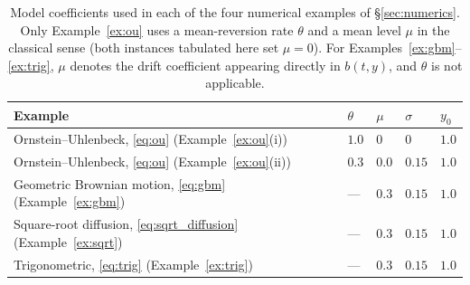 \documentclass[11pt, a4paper]{article}
\theoremstyle{theoremstyle}
\theoremstyle{definitionstyle}
\begin{document}
\begin{table}[htbp]
    \centering
    \caption{Model coefficients used in each of the four numerical examples of \S\ref{sec:numerics}. Only Example~\ref{ex:ou} uses a mean-reversion rate $\theta$ and a mean level $\mu$ in the classical sense (both instances tabulated here set $\mu=0$). For Examples~\ref{ex:gbm}--\ref{ex:trig}, $\mu$ denotes the drift coefficient appearing directly in $b(t,y)$, and $\theta$ is not applicable.}
    \label{tab:model_parameters}
    \begin{tabular}{lllll}
        \toprule
        Example & $\theta$ & $\mu$ & $\sigma$ & $y_0$ \\
        \midrule
        Ornstein--Uhlenbeck, \eqref{eq:ou} (Example~\ref{ex:ou}(i)) & $1.0$ & $0$ & $0$ & $1.0$ \\
        Ornstein--Uhlenbeck, \eqref{eq:ou} (Example~\ref{ex:ou}(ii)) & $0.3$ & $0.0$ & $0.15$ & $1.0$ \\
        Geometric Brownian motion, \eqref{eq:gbm} (Example~\ref{ex:gbm}) & --- & $0.3$ & $0.15$ & $1.0$ \\
        Square-root diffusion, \eqref{eq:sqrt_diffusion} (Example~\ref{ex:sqrt}) & --- & $0.3$ & $0.15$ & $1.0$ \\
        Trigonometric, \eqref{eq:trig} (Example~\ref{ex:trig}) & --- & $0.3$ & $0.15$ & $1.0$ \\
        \bottomrule
    \end{tabular}
\end{table}
\end{document}
